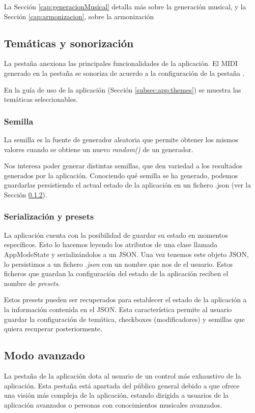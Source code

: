 La Sección \ref{cap:generacionMusical} detalla más sobre la generación musical, y la Sección \ref{cap:armonizacion}, sobre la armonización

\subsection{Temáticas y sonorización}
\label{subsec:TK:TematicasYSonorizacion}
La pestaña \textit{\tematicTabName{}} anexiona las principales funcionalidades de la aplicación. El MIDI generado en la pestaña \textit{\generationTabName{}} se sonoriza de acuerdo a la configuración de la pestaña \textit{\tematicTabName{}}. 

En la guía de uso de la aplicación (Sección \ref{subsec:app:themes}) se muestra las temáticas seleccionables.

\subsubsection{Semilla}
La semilla es la fuente de generador aleatoria que permite obtener los mismos valores cuando se obtiene un nuevo \textit{random()} de un generador.

Nos interesa poder generar distintas semillas, que den variedad a los resultados generados por la aplicación. Conociendo qué semilla se ha generado, podemos guardarlas persistiendo el actual estado de la aplicación en un fichero .json (ver la Sección \ref{subsub:TK:serializacionYPresets}).

\subsubsection{Serialización y presets}
\label{subsub:TK:serializacionYPresets}
La aplicación cuenta con la posibilidad de guardar su estado en momentos específicos. Esto lo hacemos leyendo los atributos de una clase llamada AppModeState y serializándolos a un JSON. Una vez tenemos este objeto JSON, lo persistimos a un fichero \textit{.json} con un nombre que nos de el usuario. Estos ficheros que guardan la configuración del estado de la aplicación reciben el nombre de \textit{presets}. 

Estos presets pueden ser recuperados para establecer el estado de la aplicación a la información contenida en el JSON. Esta característica permite al usuario guardar la configuración de temática, checkboxes (modificadores) y semillas que quiera recuperar posteriormente.

\subsection{Modo avanzado}
La pestaña \advancedTabName{} de la aplicación dota al usuario de un control más exhaustivo de la aplicación. Esta pestaña está apartada del público general debido a que ofrece una visión más compleja de la aplicación, estando dirigida a usuarios de la aplicación avanzados o personas con conocimientos musicales avanzados.

